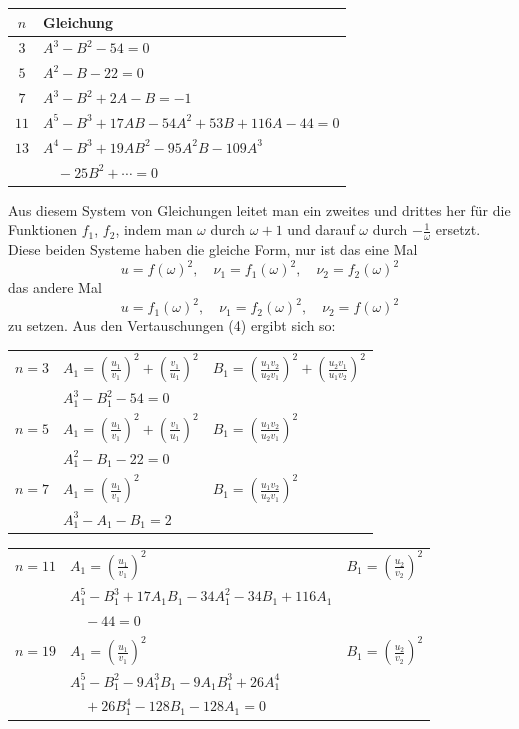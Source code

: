 \documentclass[12pt,a4paper]{article}
\theoremstyle{definition}
\begin{document}
\begin{center}
\begin{tabular}{c|l}
$n$ & Gleichung \\
\midrule
$3$ & $A^3 - B^2 - 54 = 0$ \\
$5$ & $A^2 - B - 22 = 0$ \\
$7$ & $A^3 - B^2 + 2A - B = -1$ \\
$11$ & $A^5 - B^3 + 17AB - 54A^2 + 53B + 116A - 44 = 0$ \\
$13$ & $A^4 - B^3 + 19AB^2 - 95A^2B - 109A^3$ \\
& $\quad - 25B^2 + \cdots = 0$ \\
\end{tabular}
\end{center}


Aus diesem System von Gleichungen leitet man ein zweites und drittes her für die Funktionen $f_1$, $f_2$, indem man $\omega$ durch $\omega + 1$ und darauf $\omega$ durch $-\frac{1}{\omega}$ ersetzt. Diese beiden Systeme haben die gleiche Form, nur ist das eine Mal
\[
u = f(\omega)^2, \quad \nu_1 = f_1(\omega)^2, \quad \nu_2 = f_2(\omega)^2
\]
das andere Mal
\[
u = f_1(\omega)^2, \quad \nu_1 = f_2(\omega)^2, \quad \nu_2 = f(\omega)^2
\]
zu setzen. Aus den Vertauschungen (4) ergibt sich so:

\begin{center}
\begin{tabular}{c|ll}
$n=3$ & $A_1 = \left(\frac{u_1}{v_1}\right)^2 + \left(\frac{v_1}{u_1}\right)^2$ & $B_1 = \left(\frac{u_1v_2}{u_2v_1}\right)^2 + \left(\frac{u_2v_1}{u_1v_2}\right)^2$ \\
& $A_1^3 - B_1^2 - 54 = 0$ & \\
\midrule
$n=5$ & $A_1 = \left(\frac{u_1}{v_1}\right)^2 + \left(\frac{v_1}{u_1}\right)^2$ & $B_1 = \left(\frac{u_1v_2}{u_2v_1}\right)^2$ \\
& $A_1^2 - B_1 - 22 = 0$ & \\
\midrule
$n=7$ & $A_1 = \left(\frac{u_1}{v_1}\right)^2$ & $B_1 = \left(\frac{u_1v_2}{u_2v_1}\right)^2$ \\
& $A_1^3 - A_1 - B_1 = 2$ & \\
\end{tabular}
\end{center}

\begin{center}
\begin{tabular}{c|ll}
$n=11$ & $A_1 = \left(\frac{u_1}{v_1}\right)^2$ & $B_1 = \left(\frac{u_2}{v_2}\right)^2$ \\
& $A_1^5 - B_1^3 + 17A_1B_1 - 34A_1^2 - 34B_1 + 116A_1$ & \\
& $\quad - 44 = 0$ & \\
\midrule
$n=19$ & $A_1 = \left(\frac{u_1}{v_1}\right)^2$ & $B_1 = \left(\frac{u_2}{v_2}\right)^2$ \\
& $A_1^5 - B_1^2 - 9A_1^3B_1 - 9A_1B_1^3 + 26A_1^4$ & \\
& $\quad + 26B_1^4 - 128B_1 - 128A_1 = 0$ & \\
\end{tabular}
\end{center}
\end{document}
